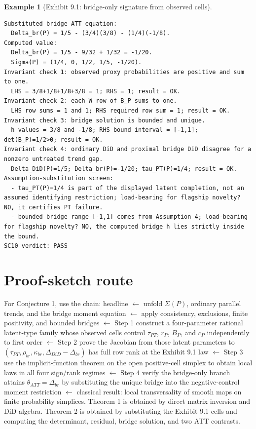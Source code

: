 \documentclass[11pt]{article}
\theoremstyle{definition}
\newtheorem{example}{Example}
\theoremstyle{plain}
\theoremstyle{remark}
\begin{document}
\begin{example}[Exhibit 9.1: bridge-only signature from observed cells]
\begin{verbatim}
Substituted bridge ATT equation:
  Delta_br(P) = 1/5 - (3/4)(3/8) - (1/4)(-1/8).
Computed value:
  Delta_br(P) = 1/5 - 9/32 + 1/32 = -1/20.
  Sigma(P) = (1/4, 0, 1/2, 1/5, -1/20).
Invariant check 1: observed proxy probabilities are positive and sum to one.
  LHS = 3/8+1/8+1/8+3/8 = 1; RHS = 1; result = OK.
Invariant check 2: each W row of B_P sums to one.
  LHS row sums = 1 and 1; RHS required row sum = 1; result = OK.
Invariant check 3: bridge solution is bounded and unique.
  h values = 3/8 and -1/8; RHS bound interval = [-1,1]; det(B_P)=1/2>0; result = OK.
Invariant check 4: ordinary DiD and proximal bridge DiD disagree for a nonzero untreated trend gap.
  Delta_DiD(P)=1/5; Delta_br(P)=-1/20; tau_PT(P)=1/4; result = OK.
Assumption-substitution screen:
  - tau_PT(P)=1/4 is part of the displayed latent completion, not an assumed identifying restriction; load-bearing for flagship novelty? NO, it certifies PT failure.
  - bounded bridge range [-1,1] comes from Assumption 4; load-bearing for flagship novelty? NO, the computed bridge h lies strictly inside the bound.
SC10 verdict: PASS
\end{verbatim}
\end{example}

\section{Proof-sketch route}
For Conjecture 1, use the chain: headline \(\leftarrow\) unfold \(\Sigma(P)\), ordinary parallel trends, and the bridge moment equation \(\leftarrow\) apply consistency, exclusions, finite positivity, and bounded bridges \(\leftarrow\) Step 1 construct a four-parameter rational latent-type family whose observed cells control \(\tau_{PT}\), \(r_P\), \(B_P\), and \(c_P\) independently to first order \(\leftarrow\) Step 2 prove the Jacobian from those latent parameters to \((\tau_{PT},\rho_{br},\kappa_{br},\Delta_{DiD}-\Delta_{br})\) has full row rank at the Exhibit 9.1 law \(\leftarrow\) Step 3 use the implicit-function theorem on the open positive-cell simplex to obtain local laws in all four sign/rank regimes \(\leftarrow\) Step 4 verify the bridge-only branch attains \(\theta_{ATT}=\Delta_{br}\) by substituting the unique bridge into the negative-control moment restriction \(\leftarrow\) classical result: local transversality of smooth maps on finite probability simplices. Theorem 1 is obtained by direct matrix inversion and DiD algebra. Theorem 2 is obtained by substituting the Exhibit 9.1 cells and computing the determinant, residual, bridge solution, and two ATT contrasts.
\end{document}
